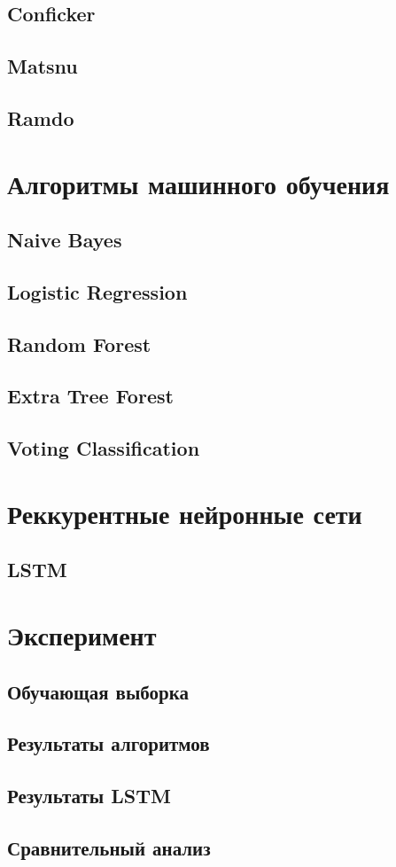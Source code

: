\subsection{Conficker}
\subsection{Matsnu}
\subsection{Ramdo}

\section{Алгоритмы машинного обучения}
\subsection{Naive Bayes}
\subsection{Logistic Regression}
\subsection{Random Forest}
\subsection*{Extra Tree Forest}
\subsection*{Voting Classification}
\clearpage

\section{Реккурентные нейронные сети}
\subsection{LSTM}
\clearpage

\section{Эксперимент}
\subsection{Обучающая выборка}
\subsection{Результаты алгоритмов}
\subsection{Результаты LSTM}
\subsection{Сравнительный анализ}


\clearpage